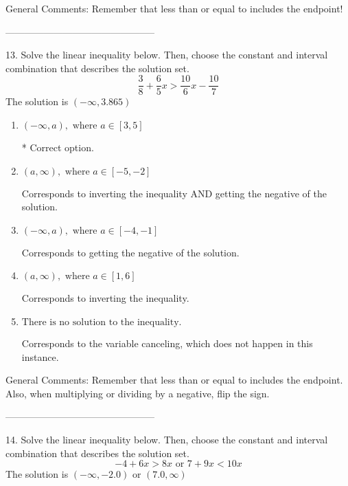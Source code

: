 \documentclass{article}[10pt]
\begin{document}
General Comments: Remember that less than or equal to includes the endpoint!

-----------------------------------------------

13. Solve the linear inequality below. Then, choose the constant and interval combination that describes the solution set.
$$ \frac{3}{8} + \frac{6}{5} x > \frac{10}{6} x - \frac{10}{7} $$ 
The solution is $ (-\infty, 3.865) $ 

\begin{enumerate}[label=\Alph*.] 
\item $ (-\infty, a), \text{ where } a \in [3, 5] $ 

  * Correct option. 
\item $ (a, \infty), \text{ where } a \in [-5, -2] $ 

 Corresponds to inverting the inequality AND getting the negative of the solution. 
\item $ (-\infty, a), \text{ where } a \in [-4, -1] $ 

 Corresponds to getting the negative of the solution. 
\item $ (a, \infty), \text{ where } a \in [1, 6] $ 

 Corresponds to inverting the inequality. 
\item $ \text{There is no solution to the inequality.} $ 

 Corresponds to the variable canceling, which does not happen in this instance. 
\end{enumerate} 
 
General Comments: Remember that less than or equal to includes the endpoint. Also, when multiplying or dividing by a negative, flip the sign.

-----------------------------------------------

14. Solve the linear inequality below. Then, choose the constant and interval combination that describes the solution set.
$$ -4 + 6 x > 8 x \text{ or } 7 + 9 x < 10 x $$ 
The solution is $ (-\infty, -2.0) \text{ or } (7.0, \infty) $ 
\end{document}

